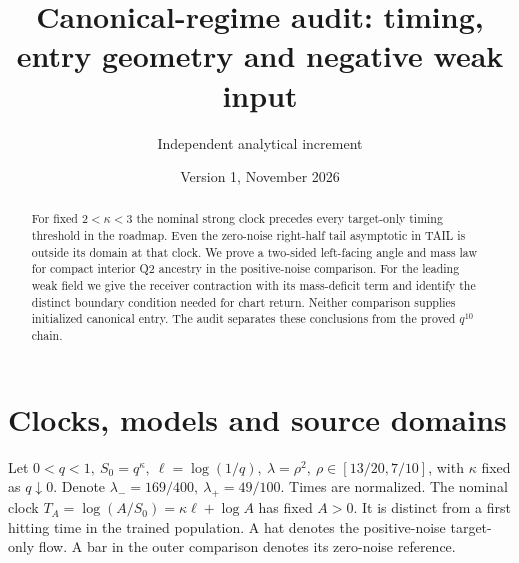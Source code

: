 \documentclass[11pt]{article}
\title{Canonical-regime audit: timing, entry geometry and negative weak input}
\author{Independent analytical increment}\date{Version 1, November 2026}
\begin{document}
\maketitle
\begin{abstract}
For fixed \(2<\kappa<3\) the nominal strong clock precedes every
target-only timing threshold in the roadmap. Even the zero-noise
right-half tail asymptotic in TAIL is outside its domain at that clock.
We prove a two-sided left-facing angle and mass law for compact interior
Q2 ancestry in the positive-noise comparison. For the leading weak field
we give the receiver contraction with its mass-deficit term and identify
the distinct boundary condition needed for chart return. Neither comparison
supplies initialized canonical entry. The audit separates these conclusions
from the proved \(q^{10}\) chain.
\end{abstract}

\section{Clocks, models and source domains}\label{an04crav1:scope}
Let \(0<q<1,\ S_0=q^\kappa,\ \ell=\log(1/q),\
\lambda=\rho^2,\ \rho\in[13/20,7/10]\), with \(\kappa\) fixed as \(q\downarrow0\).
Denote \(\lambda_- =169/400,\ \lambda_+=49/100\).
Times are normalized. The nominal clock \(T_A=\log(A/S_0)=\kappa\ell+\log A\)
has fixed \(A>0\). It is distinct from a first hitting time in the
trained population. A hat denotes the positive-noise target-only flow.
A bar in the outer comparison denotes its zero-noise reference.
\end{document}
